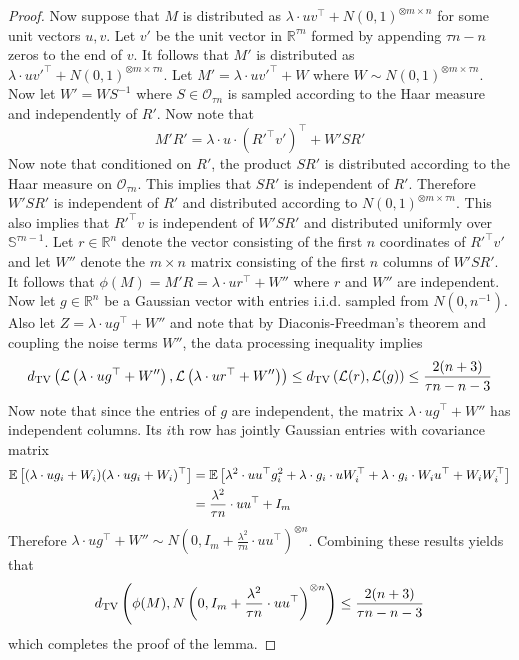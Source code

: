 \documentclass[11pt]{article}
\begin{document}
\begin{proof}
Now suppose that $M$ is distributed as $\lambda \cdot uv^\top + N(0, 1)^{\otimes m \times n}$ for some unit vectors $u, v$. Let $v'$ be the unit vector in $\mathbb{R}^{\tau n}$ formed by appending $\tau n - n$ zeros to the end of $v$. It follows that $M'$ is distributed as $\lambda \cdot uv'^\top + N(0, 1)^{\otimes m \times \tau n}$. Let $M' = \lambda \cdot uv'^\top + W$ where $W \sim N(0, 1)^{\otimes m \times \tau n}$. Now let $W' = WS^{-1}$ where $S \in \mathcal{O}_{\tau n}$ is sampled according to the Haar measure and independently of $R'$. Now note that
$$M'R' = \lambda \cdot u \cdot \left( R'^\top v' \right)^\top + W' S R'$$
Now note that conditioned on $R'$, the product $SR'$ is distributed according to the Haar measure on $\mathcal{O}_{\tau n}$. This implies that $SR'$ is independent of $R'$. Therefore $W' S R'$ is independent of $R'$ and distributed according to $N(0, 1)^{\otimes m \times \tau n}$. This also implies that $R'^\top v$ is independent of $W' S R'$ and distributed uniformly over $\mathbb{S}^{\tau n - 1}$. Let $r \in \mathbb{R}^n$ denote the vector consisting of the first $n$ coordinates of $R'^\top v'$ and let $W''$ denote the $m \times n$ matrix consisting of the first $n$ columns of $W' S R'$. It follows that $\phi(M) = M' R = \lambda \cdot u r^\top + W''$ where $r$ and $W''$ are independent. Now let $g \in \mathbb{R}^n$ be a Gaussian vector with entries i.i.d. sampled from $N(0, n^{-1})$. Also let $Z = \lambda \cdot ug^\top + W''$ and note that by Diaconis-Freedman's theorem and coupling the noise terms $W''$, the data processing inequality implies
$$d_{\text{TV}}\left( \mathcal{L}\left( \lambda \cdot ug^\top + W'' \right), \mathcal{L}\left( \lambda \cdot ur^\top + W'' \right) \right) \le d_{\text{TV}}\left( \mathcal{L}(r), \mathcal{L}(g) \right) \le \frac{2(n + 3)}{\tau n - n - 3}$$
Now note that since the entries of $g$ are independent, the matrix $\lambda \cdot u g^\top + W''$ has independent columns. Its $i$th row has jointly Gaussian entries with covariance matrix
\begin{align*}
\mathbb{E}\left[ (\lambda \cdot u g_i + W_i) (\lambda \cdot u g_i + W_i)^\top \right] &= \mathbb{E}\left[ \lambda^2 \cdot uu^\top g_i^2 + \lambda \cdot g_i  \cdot u W_i^\top + \lambda \cdot g_i \cdot W_i u^\top + W_i W_i^\top \right] \\
&= \frac{\lambda^2}{\tau n} \cdot uu^\top + I_m
\end{align*}
Therefore $\lambda \cdot ug^\top + W'' \sim N\left(0, I_m + \frac{\lambda^2}{\tau n} \cdot uu^\top\right)^{\otimes n}$. Combining these results yields that
$$d_{\text{TV}}\left( \phi(M), N\left(0, I_m + \frac{\lambda^2}{\tau n} \cdot uu^\top\right)^{\otimes n} \right) \le \frac{2(n + 3)}{\tau n - n - 3}$$
which completes the proof of the lemma.
\end{proof}
\end{document}

